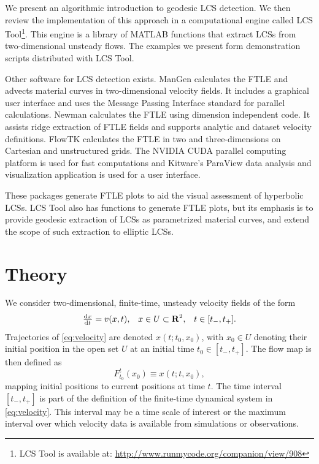 \documentclass[5p]{elsarticle}
\begin{document}
\begin{sloppypar}
We present an algorithmic introduction to geodesic LCS detection.
We then review the implementation of this approach in a computational engine called LCS Tool\footnote{LCS Tool is available at: \url{http://www.runmycode.org/companion/view/908}}.
This engine is a library of MATLAB functions that extract LCSs from two-dimensional unsteady flows. The examples we present form demonstration scripts distributed with LCS Tool.
\end{sloppypar}

Other software for LCS detection exists.
ManGen\citep{lekien03:_time} calculates the FTLE and advects material curves in two-dimensional velocity fields.
It includes a graphical user interface and uses the Message Passing Interface standard for parallel calculations.
Newman\citep{toit10:_trans} calculates the FTLE using dimension independent code.
It assists ridge extraction of FTLE fields and supports analytic and dataset velocity definitions.
FlowTK\citep{ameli14:_devel_effic_flexib_pipel_lagran} calculates the FTLE in two and three-dimensions on Cartesian and unstructured grids.
The NVIDIA CUDA parallel computing platform is used for fast computations and Kitware's ParaView data analysis and visualization application is used for a user interface.

These packages generate FTLE plots to aid the visual assessment of hyperbolic LCSs.
LCS Tool also has functions to generate FTLE plots, but its emphasis is to provide geodesic extraction of LCSs as parametrized material curves, and extend the scope of such extraction to elliptic LCSs.

\section{Theory}

We consider two-dimensional, finite-time, unsteady velocity fields of the form
\begin{align}
\od{x}{t} = v(x,t), && x \in U \subset \mathbf R^2, && t \in [t_-,t_+].
\label{eq:velocity}
\end{align}
Trajectories of \cref{eq:velocity} are denoted $x(t;t_0,x_0)$, with $x_0 \in U$ denoting their initial position in the open set $U$ at an initial time $t_0 \in [t_-,t_+]$. The flow map is then defined as
\[
F_{t_0}^t(x_0) \equiv x(t;t,x_0),
\]
mapping initial positions to current positions at time $t$. The time interval $[t_-,t_+]$ is part of the definition of the finite-time dynamical system in \cref{eq:velocity}. This interval may be a time scale of interest or the maximum interval over which velocity data is available from simulations or observations.
\end{document}
